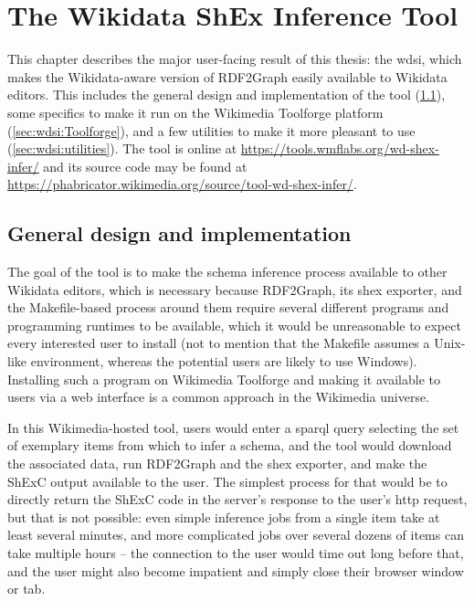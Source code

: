 
\chapter{The Wikidata ShEx Inference Tool}
\label{ch:wdsi}

This chapter describes the major user-facing result of this thesis:
the \gls{wdsi},
which makes the \gls{Wikidata}-aware %
version of \gls{RDF2Graph} easily available to \gls{Wikidata} editors.
This includes the general design and implementation of the tool (\cref{sec:wdsi:abstract}),
some specifics to make it run on the Wikimedia Toolforge platform (\cref{sec:wdsi:Toolforge}),
and a few utilities to make it more pleasant to use (\cref{sec:wdsi:utilities}).
The tool is online at \url{https://tools.wmflabs.org/wd-shex-infer/}
and its source code may be found at \url{https://phabricator.wikimedia.org/source/tool-wd-shex-infer/}.

\section{General design and implementation}
\label{sec:wdsi:abstract}

The goal of the tool is to make the \gls{schema} inference process available to other \gls{Wikidata} editors,
which is necessary because \gls{RDF2Graph}, its \gls{shex} exporter, and the Makefile-based process around them
require several different programs and programming runtimes to be available,
which it would be unreasonable to expect every interested user to install
(not to mention that the Makefile assumes a Unix-like environment,
whereas the potential users are likely to use Windows).
Installing such a program on Wikimedia Toolforge
and making it available to users via a web interface
is a common approach in the Wikimedia universe.

In this Wikimedia-hosted tool,
users would enter a \gls{sparql} query selecting the set of exemplary \glspl{item} from which to infer a \gls{schema},
and the tool would download the associated data,
run \gls{RDF2Graph} and the \gls{shex} exporter,
and make the ShExC output available to the user.
The simplest process for that would be
to directly return the ShExC code in the server’s response to the user’s \gls{http} request,
but that is not possible:
even simple inference jobs %
from a single \gls{item} take at least several minutes,
and more complicated jobs %
over several dozens of \glspl{item} can take multiple hours –
the connection to the user would time out long before that,
and the user might also become impatient and simply close their browser window or tab.

